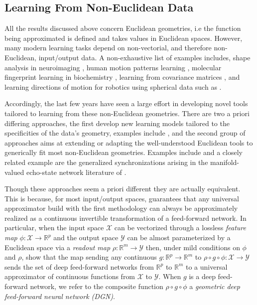 \documentclass[anon,12pt]{colt2021} %
\newcommand{\rr}{{\mathbb{R}}}
\newcommand{\rrflex}[1]{{\ensuremath{\rr^{#1}
}}}
\newcommand{\rrm}{{\rrflex{m}}}
\newcommand{\rrp}{{\rrflex{p}}}
\newcommand{\xxx}{\mathcal{X}}
\newcommand{\yyy}{\mathcal{Y}}
\begin{document}
\subsection*{Learning From Non-Euclidean Data}
All the results discussed above concern Euclidean geometries, i.e the function being approximated is defined and takes values in Euclidean spaces. However, many modern learning tasks depend on non-vectorial, and therefore non-Euclidean, input/output data.  A non-exhaustive list of examples includes, shape analysis in neuroimaging \cite{neuroimaging,shapereco}, human motion patterns learning \cite{humanmotion1, humanmotion2, humanmotion3}, molecular fingerprint learning in biochemistry \cite{biochemistry}, learning from covariance matrices \cite{BonnabelRegression,baes2019lowrank}, and learning directions of motion for robotics using spherical data such as \cite{dai2018principal,pmlr-v38-straub15,pmlr-v119-dutordoir20a}.

Accordingly, the last few years have seen a large effort in developing novel tools tailored to learning from these non-Euclidean geometries.  There are two a priori differing approaches, the first develop new learning models tailored to the specificities of the data's geometry, examples include \cite{kipf2017semisupervised,huang2017riemannian,levie2018cayleynets,s2018spherical}, and the second group of approaches aims at extending or adapting the well-understood Euclidean tools to generically fit most non-Euclidean geometries.  Examples include \cite{fletcher2011geodesic,hauberg2013unscented,ganea2018hyperbolic} and a closely related example are the generalized synchronizations arising in the manifold-valued echo-state network literature of \cite{grigoryeva2020chaos}.  

Though these approaches seem a priori different they are actually equivalent.  This is because, for most input/output spaces, \citep[Theorem 3]{Kgeneral} guarantees that any universal approximator build with the first methodology can always be approximately realized as a continuous invertible transformation of a feed-forward network.  In particular, when the input space $\xxx$ can be vectorized through a lossless \textit{feature map} $\phi:\xxx\rightarrow \rrp$ and the output space $\yyy$ can be almost parameterized by a Euclidean space via a \textit{readout map} $\rho:\rrm\rightarrow \yyy$ then, under mild conditions on $\phi$ and $\rho$, \cite{kratsios2020non} show that the map sending any continuous $g:\rrp\rightarrow\rrm$ to $\rho\circ g\circ \phi:\xxx\rightarrow \yyy$ sends the set of deep feed-forward networks from $\rrp$ to $\rrm$ to a universal approximator of continuous functions from $\xxx$ to $\yyy$.  When $g$ is a deep feed-forward network, we refer to the composite function $\rho\circ g\circ \phi$ a \textit{geometric deep feed-forward neural network (DGN)}.  
% 
\end{document}

